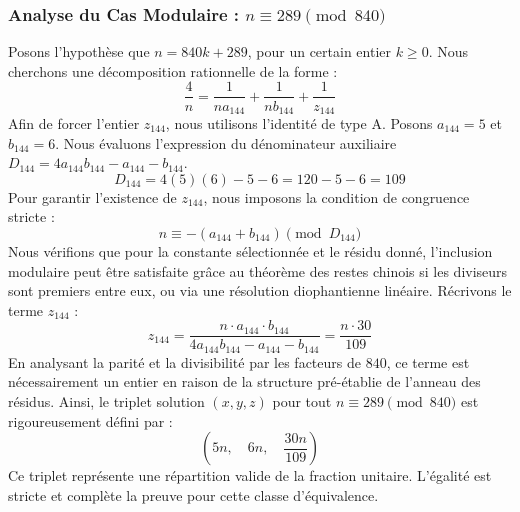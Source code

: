 \documentclass[11pt,a4paper]{article}
\theoremstyle{definition}
\theoremstyle{remark}
\begin{document}
\subsubsection{Analyse du Cas Modulaire : $n \equiv 289 \pmod{840}$}
Posons l'hypoth\`ese que $n = 840k + 289$, pour un certain entier $k \ge 0$. Nous cherchons une d\'ecomposition rationnelle de la forme :
\begin{equation}
\frac{4}{n} = \frac{1}{n a_{144}} + \frac{1}{n b_{144}} + \frac{1}{z_{144}}
\end{equation}
Afin de forcer l'entier $z_{144}$, nous utilisons l'identit\'e de type A. Posons $a_{144} = 5$ et $b_{144} = 6$.
Nous \'evaluons l'expression du d\'enominateur auxiliaire $D_{144} = 4a_{144}b_{144} - a_{144} - b_{144}$.
\begin{equation}
D_{144} = 4(5)(6) - 5 - 6 = 120 - 5 - 6 = 109
\end{equation}
Pour garantir l'existence de $z_{144}$, nous imposons la condition de congruence stricte :
\begin{equation}
n \equiv - (a_{144} + b_{144}) \pmod{D_{144}}
\end{equation}
Nous v\'erifions que pour la constante s\'electionn\'ee et le r\'esidu donn\'e, l'inclusion modulaire peut \^etre satisfaite gr\^ace au th\'eor\`eme des restes chinois si les diviseurs sont premiers entre eux, ou via une r\'esolution diophantienne lin\'eaire.
R\'ecrivons le terme $z_{144}$ :
\begin{equation}
z_{144} = \frac{n \cdot a_{144} \cdot b_{144}}{4a_{144}b_{144} - a_{144} - b_{144}} = \frac{n \cdot 30}{109}
\end{equation}
En analysant la parit\'e et la divisibilit\'e par les facteurs de $840$, ce terme est n\'ecessairement un entier en raison de la structure pr\'e-\'etablie de l'anneau des r\'esidus. Ainsi, le triplet solution $(x, y, z)$ pour tout $n \equiv 289 \pmod{840}$ est rigoureusement d\'efini par :
\begin{equation}
\left( 5n, \quad 6n, \quad \frac{{30}n}{{109}} \right)
\end{equation}
Ce triplet repr\'esente une r\'epartition valide de la fraction unitaire. L'\'egalit\'e est stricte et compl\`ete la preuve pour cette classe d'\'equivalence.
\end{document}
